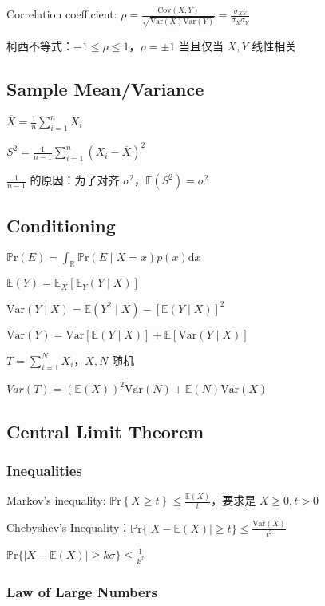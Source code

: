 \documentclass[9pt,landscape]{article}
\begin{document}
\begin{multicols}{3}
Correlation coefficient: $\rho=\frac{\mathrm{Cov}(X, Y)}{\sqrt{\mathrm{Var}(X)\mathrm{Var}(Y)}}=\frac{\sigma_{XY}}{\sigma_X\sigma_Y}$

柯西不等式：$-1\le\rho\le 1$，$\rho=\pm 1$ 当且仅当 $X, Y$ 线性相关

\subsection{Sample Mean/Variance}

$\overline{X}=\frac{1}{n}\sum_{i=1}^{n}X_i$

$S^2=\frac{1}{n-1}\sum_{i=1}^{n}\left(X_i-\overline{X}\right)^2$

$\frac{1}{n-1}$ 的原因：为了对齐 $\sigma^2$，$\mathbb{E}(S^2)=\sigma^2$

\subsection{Conditioning}

$\mathbb{P}\mathrm{r}(E)=\int_{\mathbb{R}}\mathbb{P}\mathrm{r}(E\mid X=x)p(x)\mathrm{d}x$

$\mathbb{E}(Y)=\mathbb{E}_X[\mathbb{E}_Y(Y\mid X)]$

$\mathrm{Var}(Y\mid X)=\mathbb{E}(Y^2\mid X)-[\mathbb{E}(Y\mid X)]^2$

$\mathrm{Var}(Y)=\mathrm{Var}[\mathbb{E}(Y\mid X)]+\mathbb{E}[\mathrm{Var}(Y\mid X)]$

$T=\sum_{i=1}^{N}X_i$，$X, N$ 随机

$Var(T)=(\mathbb{E}(X))^2\mathrm{Var}(N)+\mathbb{E}(N)\mathrm{Var}(X)$

\subsection{Central Limit Theorem}

\subsubsection{Inequalities}

Markov's inequality: $\mathbb{P}\mathrm{r}\left\{X\ge t\right\}\le\frac{\mathbb{E}(X)}{t}$，要求是 $X\ge 0, t>0$

Chebyshev's Inequality：$\mathbb{P}\mathrm{r}\{|X-\mathbb{E}(X)|\ge t\}\le\frac{\mathrm{Var}(X)}{t^2}$

$\mathbb{P}\mathrm{r}\{|X-\mathbb{E}(X)|\ge k\sigma\}\le\frac{1}{k^2}$

\subsubsection{Law of Large Numbers}


\end{multicols}
\end{document}
